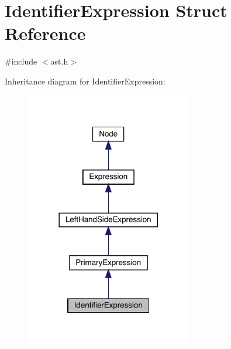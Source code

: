 \hypertarget{struct_identifier_expression}{}\section{Identifier\+Expression Struct Reference}
\label{struct_identifier_expression}


{\ttfamily \#include $<$ast.\+h$>$}



Inheritance diagram for Identifier\+Expression\+:
\nopagebreak
\begin{figure}[H]
\begin{center}
\leavevmode
\includegraphics[width=206pt]{struct_identifier_expression__inherit__graph}
\end{center}
\end{figure}


